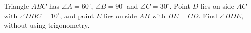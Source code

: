 Triangle $ABC$ has $\angle A=60^\circ$, $\angle B=90^\circ$ and $\angle C=30^\circ$. Point $D$ lies on side $AC$ with $\angle DBC=10^\circ$, and point $E$ lies on side $AB$ with $BE=CD$. Find $\angle BDE$, without using trigonometry.
